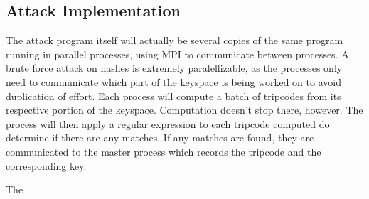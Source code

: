 \documentclass[12pt]{article}
\begin{document}
\subsection*{Attack Implementation}
The attack program itself will actually be several copies of the same program running in parallel processes, using MPI to communicate between processes. A brute force attack on hashes is extremely paralellizable, as the processes only need to communicate which part of the keyspace is being worked on to avoid duplication of effort. Each process will compute a batch of tripcodes from its respective portion of the keyspace. Computation doesn't stop there, however. The process will then apply a regular expression to each tripcode computed do determine if there are any matches. If any matches are found, they are communicated to the master process which records the tripcode and the corresponding key.

The 
\end{document}
